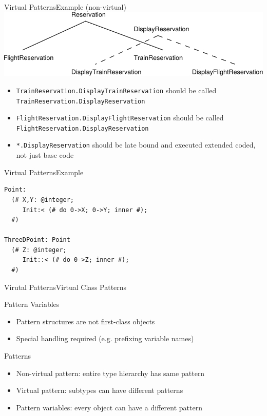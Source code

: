 \documentclass[xcolor=dvipsname,handout]{beamer} %
\begin{document}
\begin{frame}{Virtual Patterns}{Example (non-virtual)}
\includegraphics[width=\textwidth]{beta_virtual.pdf}
\vfill
\begin{itemize}
  \item \texttt{TrainReservation.DisplayTrainReservation} should be called \texttt{TrainReservation.DisplayReservation}
  \item \texttt{FlightReservation.DisplayFlightReservation} should be called \texttt{FlightReservation.DisplayReservation}
  \item \texttt{*.DisplayReservation} should be late bound and executed extended coded, not just base code
\end{itemize}
\end{frame}

\begin{frame}[fragile]{Virtual Patterns}{Example}
\begin{verbatim}
Point:
  (# X,Y: @integer;
     Init:< (# do 0->X; 0->Y; inner #);
  #)

ThreeDPoint: Point
  (# Z: @integer;
     Init::< (# do 0->Z; inner #);
  #)
\end{verbatim}
\end{frame}

\begin{frame}[fragile]{Virutal Patterns}{Virtual Class Patterns}

\end{frame}

\begin{frame}{Pattern Variables}
  \begin{itemize}
    \item Pattern structures are not first-class objects
    \item Special handling required (e.g. prefixing variable names)
  \end{itemize}
\end{frame}

\begin{frame}{Patterns}
  \begin{itemize}
    \item Non-virtual pattern: entire type hierarchy has same pattern
    \item Virtual pattern: subtypes can have different patterns
    \item Pattern variables: every object can have a different pattern
  \end{itemize}
\end{frame}
\end{document}
